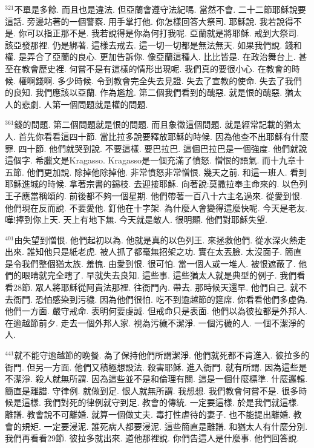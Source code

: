 \documentclass{book}
\begin{document}
$^{321}$不單是多餘.
而且也是違法.
但亞蘭會遵守法紀嗎.
當然不會.
二十二節耶穌說要這話.
旁邊站著的一個警察.
用手掌打他.
你怎樣回答大祭司.
耶穌說.
我若說得不是.
你可以指正那不是.
我若說得是你為何打我呢.
亞蘭就是將耶穌.
戒到大祭司.
該亞發那裡.
仍是綁著.
這樣去戒去.
這一切一切都是無法無天.
如果我們說.
錢和權.
是弄合了亞蘭的良心.
更加告訴你.
像亞蘭這種人.
比比皆是.
在政治舞台上.
甚至在教會歷史裡.
何嘗不是有這樣的情形出現呢.
我們真的要很小心.
在教會的時候.
權啊錢啊.
多少時候.
令到教會完全失去見證.
失去了宣教的使命.
失去了我們的良知.
我們應該以亞蘭.
作為尷尬.
第二個我們看到的醜惡.
就是恨的醜惡.
猶太人的悲劇.
人第一個問題就是權的問題.

$^{361}$錢的問題.
第二個問題就是恨的問題.
而且象徵這個問題.
就是經常記載的猶太人.
首先你看看這四十節.
當比拉多說要釋放耶穌的時候.
因為他查不出耶穌有什麼罪.
四十節.
他們就哭到說.
不要這樣.
要巴拉巴.
這個巴拉巴是一個強度.
他們就說這個字.
希臘文是Kragasso.
Kragasso是一個充滿了憤怒.
憎恨的語氣.
而十九章十五節.
他們更加說.
除掉他除掉他.
非常憤怒非常憎恨.
幾天之前.
和這一班人.
看到耶穌進城的時候.
拿著宗書的錫枝.
去迎接耶穌.
向著說:莫撒拉奉主命來的.
以色列王子應當稱頌的.
前後都不夠一個星期.
他們帶著一百八十六主名過來.
從愛到恨.
他們現在反而說.
不要愛他.
釘他在十字架.
為什麼人會變得這麼快呢.
今天是老友.
嘩!捧到你上天.
天上有地下無.
今天就是敵人.
很明顯.
他們對耶穌失望.

$^{401}$由失望到憎恨.
他們起初以為.
他就是真的以色列王.
來拯救他們.
從水深火熱走出來.
誰知他只是紙老虎.
被人抓了都毫無招架之功.
實在太丟臉.
太沒面子.
簡直是令我們整個猶太族.
羞愧.
由愛到恨.
很可怕.
當一個人或一堆人.
被恨遮蔽了.
他們的眼睛就完全瞎了.
早就失去良知.
這些事.
這些猶太人就是典型的例子.
我們看看28節.
眾人將耶穌從阿貴法那裡.
往衙門內.
帶去.
那時候天還早.
他們自己.
就不去衙門.
恐怕感染到污穢.
因為他們很怕.
吃不到逾越節的筵席.
你看看他們多虛偽.
他們一方面.
嚴守戒命.
表明何要虔誠.
但戒命只是表面.
他們以為彼拉都是外邦人.
在逾越節前夕.
走去一個外邦人家.
視為污穢不潔淨.
一個污穢的人.
一個不潔淨的人.

$^{441}$就不能守逾越節的晚餐.
為了保持他們所謂潔淨.
他們就死都不肯進入.
彼拉多的衙門.
但另一方面.
他們又積極想設法.
殺害耶穌.
進入衙門.
就有所謂.
因為這些是不潔淨.
殺人就無所謂.
因為這些並不是和倫理有關.
這是一個什麼標準.
什麼邏輯.
簡直是離譜.
守律例.
就做到足.
恨人就無所謂.
我想想.
我們教會何嘗不是.
很多時候是這樣.
我們對死的律例就守到足.
教會的傳統.
一定要這樣.
於是我們就這樣.
離譜.
教會說不可離婚.
就算一個做丈夫.
毒打性虐待的妻子.
也不能提出離婚.
教會的規矩.
一定要浸泥.
誰死病人都要浸泥.
這些簡直是離譜.
和猶太人有什麼分別.
我們再看看29節.
彼拉多就出來.
道他那裡說.
你們告這人是什麼事.
他們回答說.
\end{document}
